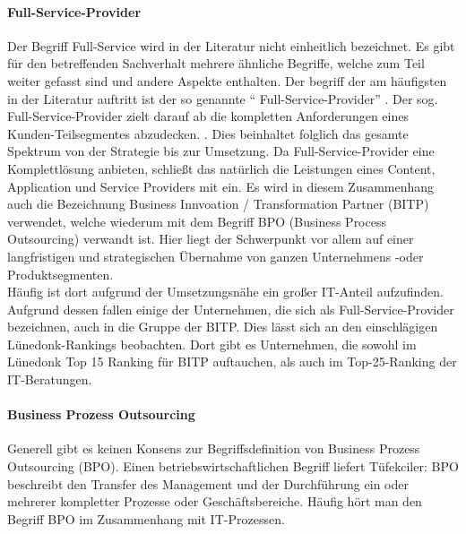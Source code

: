 \paragraph*{Full-Service-Provider}
Der Begriff Full-Service wird in der Literatur nicht einheitlich bezeichnet. Es gibt für den betreffenden Sachverhalt mehrere ähnliche Begriffe, welche zum Teil weiter gefasst sind und andere Aspekte enthalten. Der begriff der am häufigsten in der Literatur auftritt ist der so genannte `` Full-Service-Provider'' .
Der sog. \glqq Full-Service-Provider \grqq zielt darauf ab die kompletten Anforderungen eines Kunden-Teilsegmentes abzudecken. \cite[124]{WeillVitale200106}. Dies beinhaltet folglich das gesamte Spektrum von der Strategie bis zur Umsetzung. Da Full-Service-Provider eine Komplettlösung anbieten, schließt das natürlich die Leistungen eines Content, Application und Service Providers mit ein. \cite[83]{Thalmann200708}
Es wird in diesem Zusammenhang auch die Bezeichnung Business Innvoation / Transformation Partner (BITP) verwendet, welche wiederum mit dem Begriff BPO (Business Process Outsourcing) verwandt ist. Hier liegt der Schwerpunkt vor allem auf einer langfristigen und strategischen Übernahme von ganzen Unternehmens -oder Produktsegmenten. \cite[163]{Pohland200908}\\ Häufig ist dort aufgrund der Umsetzungsnähe ein großer IT-Anteil aufzufinden. Aufgrund dessen fallen einige der Unternehmen, die sich als Full-Service-Provider bezeichnen, auch in die Gruppe der BITP. Dies lässt sich an den einschlägigen Lünedonk-Rankings beobachten. Dort gibt es Unternehmen, die sowohl im Lünedonk Top 15 Ranking für BITP auftauchen, als auch im Top-25-Ranking der IT-Beratungen.\cite {topBITP} \cite {topITB}

\paragraph*{Business Prozess Outsourcing }
Generell gibt es keinen Konsens zur Begriffsdefinition von Business Prozess Outsourcing (BPO). 
Einen betriebswirtschaftlichen Begriff liefert Tüfekciler:
BPO beschreibt den Transfer des Management und der Durchführung ein oder mehrerer kompletter Prozesse oder Geschäftsbereiche.  \cite[14]{tuefekciler2011human}
Häufig hört man den Begriff BPO im Zusammenhang mit IT-Prozessen. 


